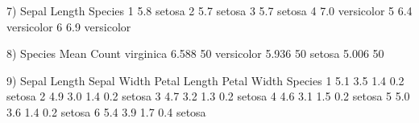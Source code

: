 \documentclass{article}
\begin{document}
7)   Sepal Length    Species
1          5.8     setosa
2          5.7     setosa
3          5.7     setosa
4          7.0 versicolor
5          6.4 versicolor
6          6.9 versicolor



8)  Species     Mean        Count
    virginica   6.588       50
    versicolor  5.936       50
    setosa      5.006       50
    
    
    
9)   Sepal Length Sepal Width Petal Length Petal Width Species
1          5.1         3.5          1.4         0.2  setosa
2          4.9         3.0          1.4         0.2  setosa
3          4.7         3.2          1.3         0.2  setosa
4          4.6         3.1          1.5         0.2  setosa
5          5.0         3.6          1.4         0.2  setosa
6          5.4         3.9          1.7         0.4  setosa
\end{document}
